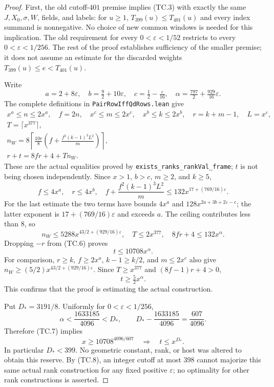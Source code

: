 \begin{proof}
First, the old cutoff-$401$ premise implies (TC.3) with exactly
the same $J,X_0,\sigma,W$, fields, and labels: for $u\geq1$,
$T_{399}(u)\leq T_{401}(u)$ and every index summand is
nonnegative.  No choice of new common windows is needed for
this implication.  The old requirement for every
$0<\varepsilon<1/52$ restricts to every
$0<\varepsilon<1/256$.  The rest of the proof establishes sufficiency
of the smaller premise; it does not assume an estimate for the
discarded weights $T_{399}(u)\leq e<T_{401}(u)$.

Write
\[
 a=2+8\varepsilon,\quad b=\tfrac92+10\varepsilon,\quad
 c=\tfrac12-\tfrac\varepsilon{16},\quad
 \alpha=\tfrac{797}{2}+\tfrac{929}{16}\varepsilon.
 \tag{TC.5}
\]
The complete definitions in \texttt{PairRowIffQdRows.lean} give
\[
 \begin{gathered}
 x^a\leq n\leq2x^a,\quad f=2n,\quad
 x^c\leq m\leq2x^c,\quad x^b\leq k\leq2x^b,\quad
 r=k+m-1,\quad L=x^\varepsilon,\\
 T=\lceil x^{377}\rceil,\\
 n_W=8\left\lceil\frac{10r}{8}
              \left(f+\frac{f^2(k-1)^3L^2}{m}\right)\right\rceil,
 \\ r+t=8fr+4+Tn_W.
 \end{gathered}
 \tag{TC.6}
\]
These are the actual equalities proved by
\texttt{exists\_ranks\_rankVal\_frame}; $t$ is not being chosen
independently.  Since $x>1$, $b>c$, $m\geq2$, and $k\geq5$,
\[
 f\leq4x^a,\quad r\leq4x^b,\quad
 f+\frac{f^2(k-1)^3L^2}{m}
        \leq132x^{17+(769/16)\varepsilon}.
\]
For the last estimate the two terms have bounds
$4x^a$ and $128x^{2a+3b+2\varepsilon-c}$; the latter exponent
is $17+(769/16)\varepsilon$ and exceeds $a$.
The ceiling contributes less than $8$, so
\[
 n_W\leq5288x^{43/2+(929/16)\varepsilon},\quad
 T\leq2x^{377},\quad 8fr+4\leq132x^\alpha.
\]
Dropping $-r$ from (TC.6) proves
\[
                         t\leq10708x^\alpha.
 \tag{TC.7}
\]
For comparison, $r\geq k$, $f\geq2x^a$, $k-1\geq k/2$,
and $m\leq2x^c$ also give $n_W\geq(5/2)
x^{43/2+(929/16)\varepsilon}$.  Since $T\geq x^{377}$ and
$(8f-1)r+4>0$,
\[
                         t\geq\tfrac52x^\alpha.
 \tag{TC.8}
\]
This confirms that the proof is estimating the actual construction.

Put $D_*=3191/8$.  Uniformly for $0<\varepsilon<1/256$,
\[
 \alpha<\frac{1633185}{4096}<D_*,\qquad
 D_*-\frac{1633185}{4096}=\frac{607}{4096}.
\]
Therefore (TC.7) implies
\[
 x\geq10708^{4096/607}\quad\Longrightarrow\quad t\leq x^{D_*}.
 \tag{TC.9}
\]
In particular $D_*<399$.  No geometric constant, rank, or host was
altered to obtain this reserve.  By (TC.8), an integer cutoff at most
$398$ cannot majorize this same actual rank construction for any fixed
positive $\varepsilon$; no optimality for other rank constructions is
asserted.


\end{proof}

